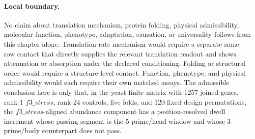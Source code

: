\paragraph{Local boundary.}
No claim about translation mechanism, protein folding, physical admissibility, molecular function, phenotype, adaptation, causation, or universality follows from this chapter alone.  Translation-rate mechanism would require a separate same-row contact that directly supplies the relevant translation readout and shows attenuation or absorption under the declared conditioning.  Folding or structural order would require a structure-level contact.  Function, phenotype, and physical admissibility would each require their own matched assays.  The admissible conclusion here is only that, in the yeast finite matrix with $1257$ joined genes, rank-$1$ $f3\_stress$, rank-$24$ controls, five folds, and $120$ fixed-design permutations, the $f3\_stress$-aligned abundance component has a position-resolved dwell increment whose passing segment is the 5-prime/head window and whose 3-prime/body counterpart does not pass.